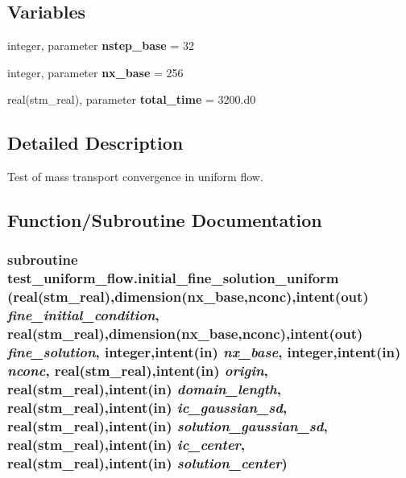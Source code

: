 \subsection*{Variables}
\begin{CompactItemize}
\item 
\hypertarget{a00096_3879e415ab927add551220af11013987}{
integer, parameter \textbf{nstep\_\-base} = 32}
\label{a00096_3879e415ab927add551220af11013987}

\item 
\hypertarget{a00096_63c492766e6c74f195c42343eb256c2a}{
integer, parameter \textbf{nx\_\-base} = 256}
\label{a00096_63c492766e6c74f195c42343eb256c2a}

\item 
\hypertarget{a00096_ce5188cdd2f7a77a2095a35d73a3dbf7}{
real(stm\_\-real), parameter \textbf{total\_\-time} = 3200.d0}
\label{a00096_ce5188cdd2f7a77a2095a35d73a3dbf7}

\end{CompactItemize}


\subsection{Detailed Description}
Test of mass transport convergence in uniform flow. 



\subsection{Function/Subroutine Documentation}
\hypertarget{a00096_028516312a117d86804268a511748b43}{
\subsubsection[{initial\_\-fine\_\-solution\_\-uniform}]{\setlength{\rightskip}{0pt plus 5cm}subroutine test\_\-uniform\_\-flow.initial\_\-fine\_\-solution\_\-uniform (real(stm\_\-real),dimension(nx\_\-base,nconc),intent(out) {\em fine\_\-initial\_\-condition}, \/  real(stm\_\-real),dimension(nx\_\-base,nconc),intent(out) {\em fine\_\-solution}, \/  integer,intent(in) {\em nx\_\-base}, \/  integer,intent(in) {\em nconc}, \/  real(stm\_\-real),intent(in) {\em origin}, \/  real(stm\_\-real),intent(in) {\em domain\_\-length}, \/  real(stm\_\-real),intent(in) {\em ic\_\-gaussian\_\-sd}, \/  real(stm\_\-real),intent(in) {\em solution\_\-gaussian\_\-sd}, \/  real(stm\_\-real),intent(in) {\em ic\_\-center}, \/  real(stm\_\-real),intent(in) {\em solution\_\-center})}}
\label{a00096_028516312a117d86804268a511748b43}


